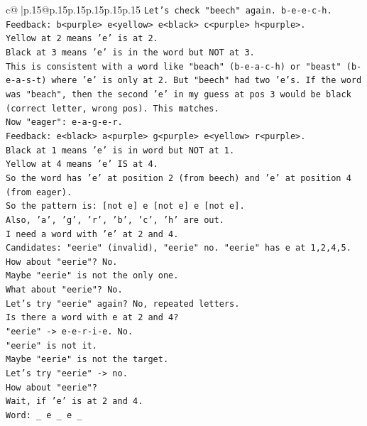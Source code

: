 \documentclass{article}
\begin{document}
{\begin{supertabular}{c@{$\;$}|p{.15\linewidth}@{}p{.15\linewidth}p{.15\linewidth}p{.15\linewidth}p{.15\linewidth}p{.15\linewidth}}
{{{\texttt{Let's check "beech" again. b{-}e{-}e{-}c{-}h.} \\
\texttt{Feedback: b<purple> e<yellow> e<black> c<purple> h<purple>.} \\
\texttt{Yellow at 2 means 'e' is at 2.} \\
\texttt{Black at 3 means 'e' is in the word but NOT at 3.} \\
\texttt{This is consistent with a word like "beach" (b{-}e{-}a{-}c{-}h) or "beast" (b{-}e{-}a{-}s{-}t) where 'e' is only at 2. But "beech" had two 'e's. If the word was "beach", then the second 'e' in my guess at pos 3 would be black (correct letter, wrong pos). This matches.} \\
\texttt{Now "eager": e{-}a{-}g{-}e{-}r.} \\
\texttt{Feedback: e<black> a<purple> g<purple> e<yellow> r<purple>.} \\
\texttt{Black at 1 means 'e' is in word but NOT at 1.} \\
\texttt{Yellow at 4 means 'e' IS at 4.} \\
\texttt{So the word has 'e' at position 2 (from beech) and 'e' at position 4 (from eager).} \\
\texttt{So the pattern is: {[}not e{]} e {[}not e{]} e {[}not e{]}.} \\
\texttt{Also, 'a', 'g', 'r', 'b', 'c', 'h' are out.} \\
\texttt{I need a word with 'e' at 2 and 4.} \\
\texttt{Candidates: "eerie" (invalid), "eerie" no. "eerie" has e at 1,2,4,5.} \\
\texttt{How about "eerie"? No.} \\
\texttt{Maybe "eerie" is not the only one.} \\
\texttt{What about "eerie"? No.} \\
\texttt{Let's try "eerie" again? No, repeated letters.} \\
\texttt{Is there a word with e at 2 and 4?} \\
\texttt{"eerie" {-}> e{-}e{-}r{-}i{-}e. No.} \\
\texttt{"eerie" is not it.} \\
\texttt{Maybe "eerie" is not the target.} \\
\texttt{Let's try "eerie" {-}> no.} \\
\texttt{How about "eerie"?} \\
\texttt{Wait, if 'e' is at 2 and 4.} \\
\texttt{Word: \_ e \_ e \_} \\
}}}
\end{supertabular}}
\end{document}
